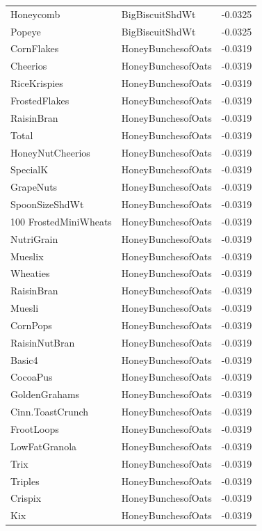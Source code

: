 \begin{longtable}{llr}
Honeycomb & BigBiscuitShdWt & -0.0325 \\
Popeye & BigBiscuitShdWt & -0.0325 \\
CornFlakes & HoneyBunchesofOats & -0.0319 \\
Cheerios & HoneyBunchesofOats & -0.0319 \\
RiceKrispies & HoneyBunchesofOats & -0.0319 \\
FrostedFlakes & HoneyBunchesofOats & -0.0319 \\
RaisinBran & HoneyBunchesofOats & -0.0319 \\
Total & HoneyBunchesofOats & -0.0319 \\
HoneyNutCheerios & HoneyBunchesofOats & -0.0319 \\
SpecialK & HoneyBunchesofOats & -0.0319 \\
GrapeNuts & HoneyBunchesofOats & -0.0319 \\
SpoonSizeShdWt & HoneyBunchesofOats & -0.0319 \\
100%
FrostedMiniWheats & HoneyBunchesofOats & -0.0319 \\
NutriGrain & HoneyBunchesofOats & -0.0319 \\
Mueslix & HoneyBunchesofOats & -0.0319 \\
Wheaties & HoneyBunchesofOats & -0.0319 \\
RaisinBran & HoneyBunchesofOats & -0.0319 \\
Muesli & HoneyBunchesofOats & -0.0319 \\
CornPops & HoneyBunchesofOats & -0.0319 \\
RaisinNutBran & HoneyBunchesofOats & -0.0319 \\
Basic4 & HoneyBunchesofOats & -0.0319 \\
CocoaPus & HoneyBunchesofOats & -0.0319 \\
GoldenGrahams & HoneyBunchesofOats & -0.0319 \\
Cinn.ToastCrunch & HoneyBunchesofOats & -0.0319 \\
FrootLoops & HoneyBunchesofOats & -0.0319 \\
LowFatGranola & HoneyBunchesofOats & -0.0319 \\
Trix & HoneyBunchesofOats & -0.0319 \\
Triples & HoneyBunchesofOats & -0.0319 \\
Crispix & HoneyBunchesofOats & -0.0319 \\
Kix & HoneyBunchesofOats & -0.0319 \\

\end{longtable}
